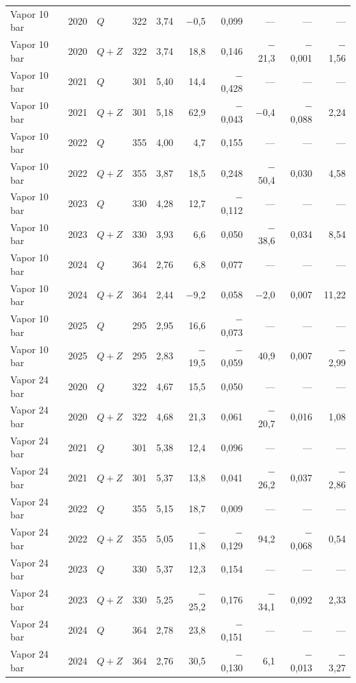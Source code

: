 {\begin{xltabular}{\linewidth}{@{}lllrrrrrrr@{}}
Vapor 10 bar & 2020 & $Q$ & 322 & 3,74 & $-$0,5 & 0,099 & --- & --- & --- \\
Vapor 10 bar & 2020 & $Q+Z$ & 322 & 3,74 & 18,8 & 0,146 & $-$21,3 & $-$0,001 & $-$1,56 \\
Vapor 10 bar & 2021 & $Q$ & 301 & 5,40 & 14,4 & $-$0,428 & --- & --- & --- \\
Vapor 10 bar & 2021 & $Q+Z$ & 301 & 5,18 & 62,9 & $-$0,043 & $-$0,4 & $-$0,088 & 2,24 \\
Vapor 10 bar & 2022 & $Q$ & 355 & 4,00 & 4,7 & 0,155 & --- & --- & --- \\
Vapor 10 bar & 2022 & $Q+Z$ & 355 & 3,87 & 18,5 & 0,248 & $-$50,4 & 0,030 & 4,58 \\
Vapor 10 bar & 2023 & $Q$ & 330 & 4,28 & 12,7 & $-$0,112 & --- & --- & --- \\
Vapor 10 bar & 2023 & $Q+Z$ & 330 & 3,93 & 6,6 & 0,050 & $-$38,6 & 0,034 & 8,54 \\
Vapor 10 bar & 2024 & $Q$ & 364 & 2,76 & 6,8 & 0,077 & --- & --- & --- \\
Vapor 10 bar & 2024 & $Q+Z$ & 364 & 2,44 & $-$9,2 & 0,058 & $-$2,0 & 0,007 & 11,22 \\
Vapor 10 bar & 2025 & $Q$ & 295 & 2,95 & 16,6 & $-$0,073 & --- & --- & --- \\
Vapor 10 bar & 2025 & $Q+Z$ & 295 & 2,83 & $-$19,5 & $-$0,059 & 40,9 & 0,007 & $-$2,99 \\
Vapor 24 bar & 2020 & $Q$ & 322 & 4,67 & 15,5 & 0,050 & --- & --- & --- \\
Vapor 24 bar & 2020 & $Q+Z$ & 322 & 4,68 & 21,3 & 0,061 & $-$20,7 & 0,016 & 1,08 \\
Vapor 24 bar & 2021 & $Q$ & 301 & 5,38 & 12,4 & 0,096 & --- & --- & --- \\
Vapor 24 bar & 2021 & $Q+Z$ & 301 & 5,37 & 13,8 & 0,041 & $-$26,2 & 0,037 & $-$2,86 \\
Vapor 24 bar & 2022 & $Q$ & 355 & 5,15 & 18,7 & 0,009 & --- & --- & --- \\
Vapor 24 bar & 2022 & $Q+Z$ & 355 & 5,05 & $-$11,8 & $-$0,129 & 94,2 & $-$0,068 & 0,54 \\
Vapor 24 bar & 2023 & $Q$ & 330 & 5,37 & 12,3 & 0,154 & --- & --- & --- \\
Vapor 24 bar & 2023 & $Q+Z$ & 330 & 5,25 & $-$25,2 & 0,176 & $-$34,1 & 0,092 & 2,33 \\
Vapor 24 bar & 2024 & $Q$ & 364 & 2,78 & 23,8 & $-$0,151 & --- & --- & --- \\
Vapor 24 bar & 2024 & $Q+Z$ & 364 & 2,76 & 30,5 & $-$0,130 & 6,1 & $-$0,013 & $-$3,27 \\

\end{xltabular}}
